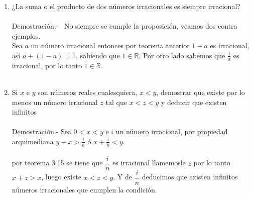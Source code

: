 \begin{enumerate}[\bfseries  1.]
\item ¿La suma o el producto de dos números irracionales es siempre irracional?\\\\
Demostración.- \, No siempre se cumple la proposición, veamos dos contra ejemplos.\\
Sea $a$ un número irracional entonces por teorema anterior $1-a$ es irracional, así $a+(1-a)=1$, sabiendo que $1\in \mathbb{R}$. Por otro lado sabemos que $\displaystyle\frac{1}{a}$ es irracional, por lo tanto $1\in \mathbb{R}$.\\\\

\item Si $x$ e $y$ son números reales cualesquiera, $x<y$, demostrar que existe por lo menos un número irracional $z$ tal que $x<z<y$ y deducir que existen infinitos\\\\
Demostración.- \; Sea $0<x<y$ e $i$ un número irracional, por propiedad arquimediana  $y-x>\displaystyle\frac{i}{n}$ \; ó \; $\displaystyle x+ \frac{i}{n}<y$. \\\\
por teorema 3.15 \; se tiene que $\dfrac{i}{n}$ es irracional llamemosle $z$ por lo tanto  $x+z>x$, luego existe $x<z<y$. Y de $\dfrac{i}{n}$  deducimos que existen infinitos números irracionales que cumplen la condición.\\\\


\end{enumerate}
